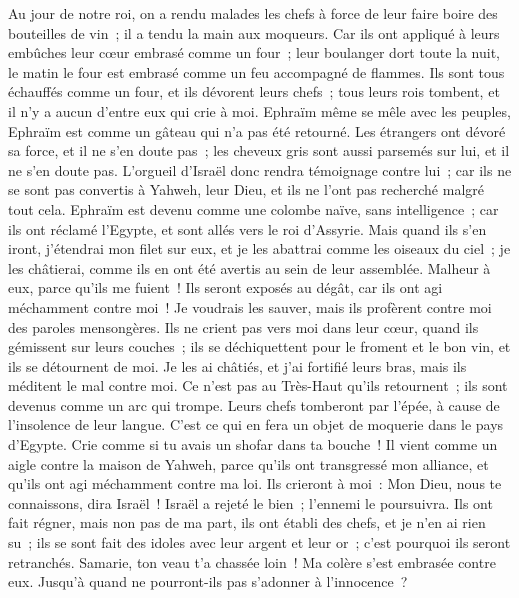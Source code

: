 \begin{multicols}{2}
Au jour de notre roi, on a rendu malades les chefs à force de leur faire boire des bouteilles de vin~; il a tendu la main aux moqueurs.
Car ils ont appliqué à leurs embûches leur cœur embrasé comme un four~; leur boulanger dort toute la nuit, le matin le four est embrasé comme un feu accompagné de flammes.
Ils sont tous échauffés comme un four, et ils dévorent leurs chefs~; tous leurs rois tombent, et il n'y a aucun d'entre eux qui crie à moi.
Ephraïm même se mêle avec les peuples, Ephraïm est comme un gâteau qui n'a pas été retourné.
Les étrangers ont dévoré sa force, et il ne s'en doute pas~; les cheveux gris sont aussi parsemés sur lui, et il ne s'en doute pas.
L'orgueil d'Israël donc rendra témoignage contre lui~; car ils ne se sont pas convertis à Yahweh, leur Dieu, et ils ne l'ont pas recherché malgré tout cela. 
Ephraïm est devenu comme une colombe naïve, sans intelligence~; car ils ont réclamé l'Egypte, et sont allés vers le roi d'Assyrie.
Mais quand ils s'en iront, j'étendrai mon filet sur eux, et je les abattrai comme les oiseaux du ciel~; je les châtierai, comme ils en ont été avertis au sein de leur assemblée.
Malheur à eux, parce qu'ils me fuient~! Ils seront exposés au dégât, car ils ont agi méchamment contre moi~! Je voudrais les sauver, mais ils profèrent contre moi des paroles mensongères.
Ils ne crient pas vers moi dans leur cœur, quand ils gémissent sur leurs couches~; ils se déchiquettent pour le froment et le bon vin, et ils se détournent de moi.
Je les ai châtiés, et j'ai fortifié leurs bras, mais ils méditent le mal contre moi.
Ce n'est pas au Très-Haut qu'ils retournent~; ils sont devenus comme un arc qui trompe. Leurs chefs tomberont par l'épée, à cause de l'insolence de leur langue. C'est ce qui en fera un objet de moquerie dans le pays d'Egypte.
\VerseOne{}Crie comme si tu avais un shofar dans ta bouche~! Il vient comme un aigle contre la maison de Yahweh, parce qu'ils ont transgressé mon alliance, et qu'ils ont agi méchamment contre ma loi.
Ils crieront à moi~: Mon Dieu, nous te connaissons, dira Israël~!
Israël a rejeté le bien~; l'ennemi le poursuivra.
Ils ont fait régner, mais non pas de ma part, ils ont établi des chefs, et je n'en ai rien su~; ils se sont fait des idoles avec leur argent et leur or~; c'est pourquoi ils seront retranchés.
Samarie, ton veau t'a chassée loin~! Ma colère s'est embrasée contre eux. Jusqu'à quand ne pourront-ils pas s'adonner à l'innocence~?

\end{multicols}
